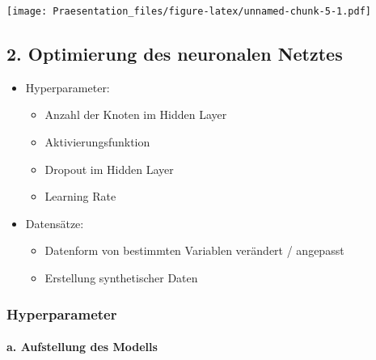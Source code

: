 \documentclass[
]{article}
\providecommand{\tightlist}{%
  \setlength{\itemsep}{0pt}\setlength{\parskip}{0pt}}
\begin{document}
\texttt{[image: Praesentation\_files/figure-latex/unnamed-chunk-5-1.pdf]}

\hypertarget{optimierung-des-neuronalen-netztes}{%
\subsection{2. Optimierung des neuronalen
Netztes}\label{optimierung-des-neuronalen-netztes}}

\begin{itemize}
\tightlist
\item
  Hyperparameter:

  \begin{itemize}
  \tightlist
  \item
    Anzahl der Knoten im Hidden Layer
  \item
    Aktivierungsfunktion
  \item
    Dropout im Hidden Layer
  \item
    Learning Rate
  \end{itemize}
\item
  Datensätze:

  \begin{itemize}
  \tightlist
  \item
    Datenform von bestimmten Variablen verändert / angepasst
  \item
    Erstellung synthetischer Daten
  \end{itemize}
\end{itemize}

\hypertarget{hyperparameter}{%
\subsubsection{Hyperparameter}\label{hyperparameter}}

\hypertarget{a.-aufstellung-des-modells}{%
\paragraph{a. Aufstellung des
Modells}\label{a.-aufstellung-des-modells}}
\end{document}
